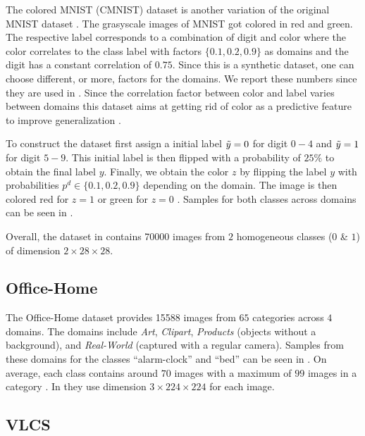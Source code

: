 The colored MNIST (CMNIST) dataset \citep{arjovsky2019invariant} is another variation of the original MNIST dataset \citep{lecun-mnisthandwrittendigit-2010}. The grasyscale images of MNIST got colored in red and green. The respective label corresponds to a combination of digit and color where the color correlates to the class label with factors $\{0.1,0.2,0.9\}$ as domains and the digit has a constant correlation of $0.75$. Since this is a synthetic dataset, one can choose different, or more, factors for the domains. We report these numbers since they are used in \citet{gulrajani2020search, arjovsky2019invariant}. Since the correlation factor between color and label varies between domains this dataset aims at getting rid of color as a predictive feature to improve generalization \citep{arjovsky2019invariant}.

To construct the dataset \citet{arjovsky2019invariant} first assign a initial label $\Tilde{y} = 0$ for digit $0-4$ and $\Tilde{y} = 1$ for digit $5-9$. This initial label is then flipped with a probability of $25\%$ to obtain the final label $y$. Finally, we obtain the color $z$ by flipping the label $y$ with probabilities $p^d \in \{0.1,0.2,0.9\}$ depending on the domain. The image is then colored red for $z=1$ or green for $z=0$ \citep{arjovsky2019invariant}. Samples for both classes across domains can be seen in .

Overall, the dataset in \citet{gulrajani2020search} contains \num{70000} images from $2$ homogeneous classes ($0$ \& $1$) of dimension $2 \times 28 \times 28$.  


\subsection{Office-Home}
The Office-Home dataset \citep{VenkateswaraECP17}  provides \num{15588} images from $65$ categories across $4$ domains. The domains include \emph{Art}, \emph{Clipart}, \emph{Products} (objects without a background), and \emph{Real-World} (captured with a regular camera). Samples from these domains for the classes ``alarm-clock'' and ``bed'' can be seen in . On average, each class contains around $70$ images with a maximum of $99$ images in a category \citep{VenkateswaraECP17}. In \citet{gulrajani2020search} they use dimension $3 \times 224 \times 224$ for each image. 


\subsection{VLCS}

